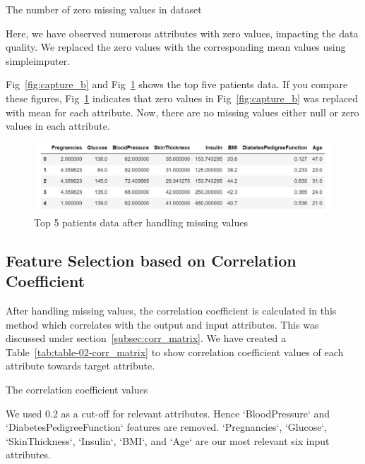  \begin{table}[ht!]
    \centering
    \caption{The number of zero missing values in dataset}
    
    \label{tab:table-01-missing-values}
\end{table}

Here, we have observed numerous attributes with zero values, impacting the data quality. We replaced the zero values with the corresponding mean values using simpleimputer.

Fig~\ref{fig:capture_b} and Fig~\ref{fig:capture_f} shows the top five patients data. If you compare these figures, Fig~\ref{fig:capture_f} indicates that zero values in Fig~\ref{fig:capture_b} was replaced with mean for each attribute. Now, there are no missing values either null or zero values in each attribute.

\begin{figure}[ht]
    \centering    \includegraphics[scale=0.8]{figures/data_info_after_imputer.pdf}
    \caption{Top 5 patients data after handling missing values}
    \label{fig:capture_f}
\end{figure}

\subsection{Feature Selection based on Correlation Coefficient}
After handling missing values, the correlation coefficient is calculated in this method which correlates with the output and input attributes. This was discussed under section~\ref{subsec:corr_matrix}. We have created a Table~\ref{tab:table-02-corr_matrix} to show correlation coefficient values of each attribute towards target attribute.

 \begin{table}[ht!]
    \centering
    \caption{The correlation coefficient values}
    
    \label{tab:table-02-corr_matrix}
\end{table}

We used 0.2 as a cut-off for relevant attributes. Hence   `BloodPressure` and `DiabetesPedigreeFunction` features are removed. `Pregnancies`, `Glucose`, `SkinThickness`, `Insulin`, `BMI`, and `Age` are our most relevant six input attributes.

